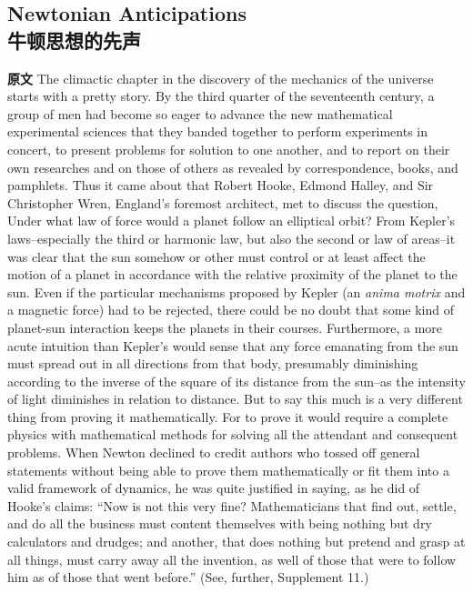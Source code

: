 \documentclass[UTF8,zihao=-4]{ctexart}
\begin{document}
\subsection*{Newtonian Anticipations\\牛顿思想的先声}

\noindent\textbf{原文} The climactic chapter in the discovery of the mechanics of the universe starts with a pretty story. By the third quarter of the seventeenth century, a group of men had become so eager to advance the new mathematical experimental sciences that they banded together to perform experiments in concert, to present problems for solution to one another, and to report on their own researches and on those of others as revealed by correspondence, books, and pamphlets. Thus it came about that Robert Hooke, Edmond Halley, and Sir Christopher Wren, England's foremost architect, met to discuss the question, Under what law of force would a planet follow an elliptical orbit? From Kepler's laws--especially the third or harmonic law, but also the second or law of areas--it was clear that the sun somehow or other must control or at least affect the motion of a planet in accordance with the relative proximity of the planet to the sun. Even if the particular mechanisms proposed by Kepler (an \emph{anima motrix} and a magnetic force) had to be rejected, there could be no doubt that some kind of planet-sun interaction keeps the planets in their courses. Furthermore, a more acute intuition than Kepler's would sense that any force emanating from the sun must spread out in all directions from that body, presumably diminishing according to the inverse of the square of its distance from the sun--as the intensity of light diminishes in relation to distance. But to say this much is a very different thing from proving it mathematically. For to prove it would require a complete physics with mathematical methods for solving all the attendant and consequent problems. When Newton declined to credit authors who tossed off general statements without being able to prove them mathematically or fit them into a valid framework of dynamics, he was quite justified in saying, as he did of Hooke's claims: ``Now is not this very fine? Mathematicians that find out, settle, and do all the business must content themselves with being nothing but dry calculators and drudges; and another, that does nothing but pretend and grasp at all things, must carry away all the invention, as well of those that were to follow him as of those that went before.'' (See, further, Supplement 11.)
\end{document}
